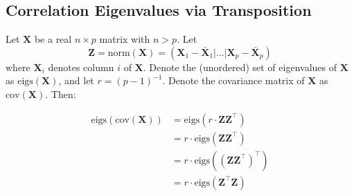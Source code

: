 \documentclass[12pt]{spieman}  %
\begin{document}
\begin{spacing}{2}


\appendix    %

\section{Correlation Eigenvalues via Transposition}
\label{sec:transpose}

Let \(\mathbf{X}\) be a real \(n \times p\) matrix with \(n > p\). Let
\[
\mathbf{Z} = \text{norm}(\mathbf{X}) =
\left(
\mathbf{X}_1 - \bar{\mathbf{X}}_1 | \dots | \mathbf{X}_p - \bar{\mathbf{X}}_p
\right)
\]
where \(\mathbf{X}_i\) denotes column \(i\) of \(\mathbf{X}\). Denote the (unordered) set
of eigenvalues of \(\mathbf{X}\) as \(\text{eigs}(\mathbf{X})\), and let \(r = (p - 1)^{-1}\).
Denote the covariance matrix of \(\mathbf{X}\) as \(\text{cov}(\mathbf{X})\).  Then:

\begin{align*}
\text{eigs}\left( \text{cov}(\mathbf{X})  \right)
&= \text{eigs}(r \cdot \mathbf{Z}\mathbf{Z}^{\top}) \\
&= r \cdot \text{eigs}(\mathbf{Z}\mathbf{Z}^{\top}) \\
&= r \cdot \text{eigs}((\mathbf{Z}\mathbf{Z}^{\top})^{\top}) \\
&= r \cdot \text{eigs}(\mathbf{Z}^{\top}\mathbf{Z}) \\
\end{align*}


\end{spacing}
\end{document}
